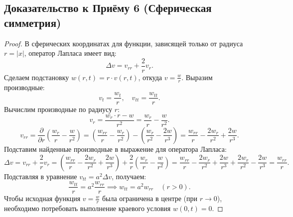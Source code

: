 \subsection*{Доказательство к Приёму 6 (Сферическая симметрия)}
\begin{proof}
В сферических координатах для функции, зависящей только от радиуса $r = |x|$, оператор Лапласа имеет вид:
\[ \Delta v = v_{rr} + \frac{2}{r}v_r. \]
Сделаем подстановку $w(r,t) = r \cdot v(r,t)$, откуда $v = \frac{w}{r}$. Выразим производные:
\[
v_t = \frac{w_t}{r}, \quad v_{tt} = \frac{w_{tt}}{r}.
\]
Вычислим производные по радиусу $r$:
\[
v_r = \frac{w_r \cdot r - w}{r^2} = \frac{w_r}{r} - \frac{w}{r^2}.
\]
\[
v_{rr} = \frac{\partial}{\partial r} \left( \frac{w_r}{r} - \frac{w}{r^2} \right) = \left( \frac{w_{rr}}{r} - \frac{w_r}{r^2} \right) - \left( \frac{w_r}{r^2} - \frac{2w}{r^3} \right) = \frac{w_{rr}}{r} - \frac{2w_r}{r^2} + \frac{2w}{r^3}.
\]
Подставим найденные производные в выражение для оператора Лапласа:
\[
\Delta v = v_{rr} + \frac{2}{r}v_r = \left( \frac{w_{rr}}{r} - \frac{2w_r}{r^2} + \frac{2w}{r^3} \right) + \frac{2}{r} \left( \frac{w_r}{r} - \frac{w}{r^2} \right) = \frac{w_{rr}}{r} - \frac{2w_r}{r^2} + \frac{2w}{r^3} + \frac{2w_r}{r^2} - \frac{2w}{r^3} = \frac{w_{rr}}{r}.
\]
Подставляя в уравнение $v_{tt} = a^2\Delta v$, получаем:
\[
\frac{w_{tt}}{r} = a^2 \frac{w_{rr}}{r} \implies w_{tt} = a^2 w_{rr} \quad (r>0).
\]
Чтобы исходная функция $v = \frac{w}{r}$ была ограничена в центре (при $r \to 0$), необходимо потребовать выполнение краевого условия $w(0, t) = 0$.
\end{proof}

